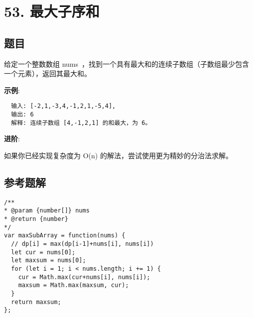 \newpage
\section{53. 最大子序和}
\label{leetcode:53}

\subsection{题目}

给定一个整数数组 nums ，找到一个具有最大和的连续子数组（子数组最少包含一个元素），返回其最大和。

\textbf{示例}:

\begin{verbatim}
  输入: [-2,1,-3,4,-1,2,1,-5,4],
  输出: 6
  解释: 连续子数组 [4,-1,2,1] 的和最大，为 6。
\end{verbatim}

\textbf{进阶}:

如果你已经实现复杂度为 O(n) 的解法，尝试使用更为精妙的分治法求解。

\subsection{参考题解}

\begin{verbatim}
/**
* @param {number[]} nums
* @return {number}
*/
var maxSubArray = function(nums) {
  // dp[i] = max(dp[i-1]+nums[i], nums[i])
  let cur = nums[0];
  let maxsum = nums[0];
  for (let i = 1; i < nums.length; i += 1) {
    cur = Math.max(cur+nums[i], nums[i]);
    maxsum = Math.max(maxsum, cur);
  }
  return maxsum;
};
\end{verbatim}
